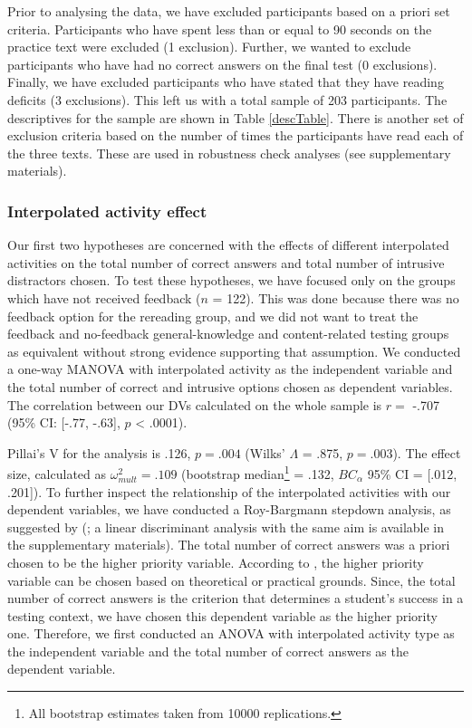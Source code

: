 \documentclass[11pt,]{article}
\let\rmarkdownfootnote\footnote%
\def\footnote{\protect\rmarkdownfootnote}
\begin{document}
Prior to analysing the data, we have excluded participants based on a
priori set criteria. Participants who have spent less than or equal to
90 seconds on the practice text were excluded (1 exclusion). Further, we
wanted to exclude participants who have had no correct answers on the
final test (0 exclusions). Finally, we have excluded participants who
have stated that they have reading deficits (3 exclusions). This left us
with a total sample of 203 participants. The descriptives for the sample
are shown in Table \ref{descTable}. There is another set of exclusion
criteria based on the number of times the participants have read each of
the three texts. These are used in robustness check analyses (see
supplementary materials).

\hypertarget{interpolated-activity-effect}{%
\subsubsection{Interpolated activity
effect}\label{interpolated-activity-effect}}

Our first two hypotheses are concerned with the effects of different
interpolated activities on the total number of correct answers and total
number of intrusive distractors chosen. To test these hypotheses, we
have focused only on the groups which have not received feedback (\(n\)
= 122). This was done because there was no feedback option for the
rereading group, and we did not want to treat the feedback and
no-feedback general-knowledge and content-related testing groups as
equivalent without strong evidence supporting that assumption. We
conducted a one-way MANOVA with interpolated activity as the independent
variable and the total number of correct and intrusive options chosen as
dependent variables. The correlation between our DVs calculated on the
whole sample is \(r =\) -.707 (95\% CI: {[}-.77, -.63{]}, \(p\)
\textless{} .0001).

Pillai's V for the analysis is .126, \(p = .004\) (Wilks' \(\Lambda\) =
.875, \(p = .003\)). The effect size, calculated as
\(\omega^2_{mult} = .109\) (bootstrap
median\footnote{All bootstrap estimates taken from 10000 replications.}
= .132, \(BC_\alpha\) 95\% CI = {[}.012, .201{]}). To further inspect
the relationship of the interpolated activities with our dependent
variables, we have conducted a Roy-Bargmann stepdown analysis, as
suggested by \citeauthor{tabachnickUsingMultivariateStatistics2012}
(\citeyear{tabachnickUsingMultivariateStatistics2012}; a linear
discriminant analysis with the same aim is available in the
supplementary materials). The total number of correct answers was a
priori chosen to be the higher priority variable. According to
\citet{tabachnickUsingMultivariateStatistics2012}, the higher priority
variable can be chosen based on theoretical or practical grounds. Since,
the total number of correct answers is the criterion that determines a
student's success in a testing context, we have chosen this dependent
variable as the higher priority one. Therefore, we first conducted an
ANOVA with interpolated activity type as the independent variable and
the total number of correct answers as the dependent variable.
\end{document}
